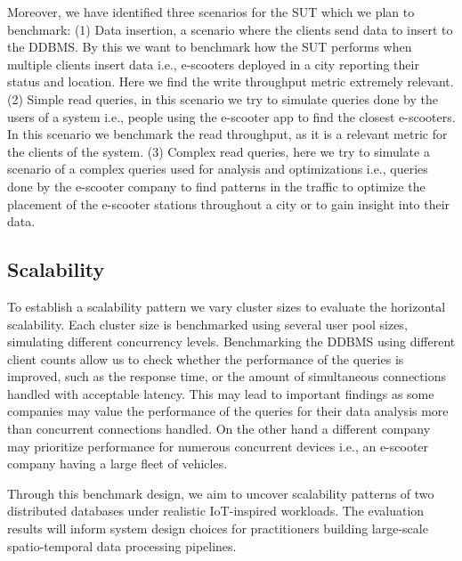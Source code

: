 Moreover, we have identified three scenarios for the SUT which we plan to benchmark:
(1) Data insertion, a scenario where the clients send data to insert to the DDBMS.
By this we want to benchmark how the SUT performs when multiple clients insert data i.e., e-scooters deployed in a city reporting their status and location.
Here we find the write throughput metric extremely relevant.
(2) Simple read queries, in this scenario we try to simulate queries done by the users of a system i.e., people using the e-scooter app to find the closest e-scooters.
In this scenario we benchmark the read throughput, as it is a relevant metric for the clients of the system.
(3) Complex read queries, here we try to simulate a scenario of a complex queries used for analysis and optimizations i.e., queries done by the e-scooter company to find patterns in the traffic to optimize the placement of the e-scooter stations throughout a city or to gain insight into their data.

\subsection{Scalability}
To establish a scalability pattern we vary cluster sizes to evaluate the horizontal scalability.
Each cluster size is benchmarked using several user pool sizes, simulating different concurrency levels.
Benchmarking the DDBMS using different client counts allow us to check whether the performance of the queries is improved, such as the response time, or the amount of simultaneous connections handled with acceptable latency.
This may lead to important findings as some companies may value the performance of the queries for their data analysis more than concurrent connections handled.
On the other hand a different company may prioritize performance for numerous concurrent devices i.e., an e-scooter company having a large fleet of vehicles.

Through this benchmark design, we aim to uncover scalability patterns of two distributed databases under realistic IoT-inspired workloads.
The evaluation results will inform system design choices for practitioners building large-scale spatio-temporal data processing pipelines.
